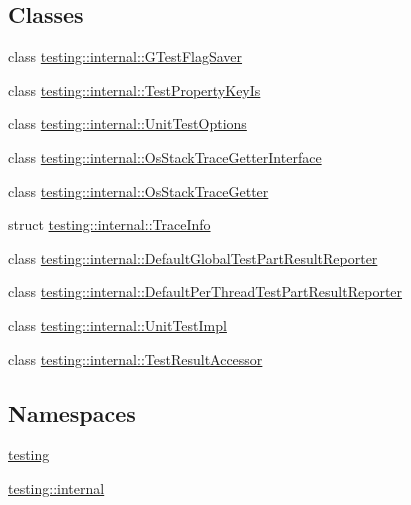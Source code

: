 \subsection*{Classes}
\begin{DoxyCompactItemize}
\item 
class \hyperlink{classtesting_1_1internal_1_1GTestFlagSaver}{testing\+::internal\+::\+G\+Test\+Flag\+Saver}
\item 
class \hyperlink{classtesting_1_1internal_1_1TestPropertyKeyIs}{testing\+::internal\+::\+Test\+Property\+Key\+Is}
\item 
class \hyperlink{classtesting_1_1internal_1_1UnitTestOptions}{testing\+::internal\+::\+Unit\+Test\+Options}
\item 
class \hyperlink{classtesting_1_1internal_1_1OsStackTraceGetterInterface}{testing\+::internal\+::\+Os\+Stack\+Trace\+Getter\+Interface}
\item 
class \hyperlink{classtesting_1_1internal_1_1OsStackTraceGetter}{testing\+::internal\+::\+Os\+Stack\+Trace\+Getter}
\item 
struct \hyperlink{structtesting_1_1internal_1_1TraceInfo}{testing\+::internal\+::\+Trace\+Info}
\item 
class \hyperlink{classtesting_1_1internal_1_1DefaultGlobalTestPartResultReporter}{testing\+::internal\+::\+Default\+Global\+Test\+Part\+Result\+Reporter}
\item 
class \hyperlink{classtesting_1_1internal_1_1DefaultPerThreadTestPartResultReporter}{testing\+::internal\+::\+Default\+Per\+Thread\+Test\+Part\+Result\+Reporter}
\item 
class \hyperlink{classtesting_1_1internal_1_1UnitTestImpl}{testing\+::internal\+::\+Unit\+Test\+Impl}
\item 
class \hyperlink{classtesting_1_1internal_1_1TestResultAccessor}{testing\+::internal\+::\+Test\+Result\+Accessor}
\end{DoxyCompactItemize}
\subsection*{Namespaces}
\begin{DoxyCompactItemize}
\item 
 \hyperlink{namespacetesting}{testing}
\item 
 \hyperlink{namespacetesting_1_1internal}{testing\+::internal}
\end{DoxyCompactItemize}
